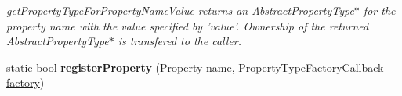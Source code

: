 \begin{DoxyCompactItemize}
\begin{DoxyCompactList}\small\item\em get\-Property\-Type\-For\-Property\-Name\-Value returns an Abstract\-Property\-Type$\ast$ for the property name with the value specified by 'value'. Ownership of the returned Abstract\-Property\-Type$\ast$ is transfered to the caller. \end{DoxyCompactList}\item 
\hypertarget{classVehicleProperty_aec55cb2758688c0e92dc53f67b320208}{static bool {\bfseries register\-Property} (Property name, \hyperlink{classVehicleProperty_a6fdd075ce5b867b571020fcdc723ddcf}{Property\-Type\-Factory\-Callback} \hyperlink{classVehicleProperty_a528c8e2ee75036f6e50c0121f4184fa2}{factory})}\label{classVehicleProperty_aec55cb2758688c0e92dc53f67b320208}

\end{DoxyCompactItemize}
